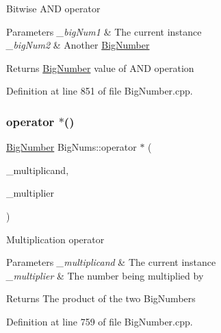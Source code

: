 Bitwise A\+ND operator 
\begin{DoxyParams}{Parameters}
{\em \+\_\+big\+Num1} & The current instance \\
\hline
{\em \+\_\+big\+Num2} & Another \mbox{\hyperlink{class_big_nums_1_1_big_number}{Big\+Number}} \\
\hline
\end{DoxyParams}
\begin{DoxyReturn}{Returns}
\mbox{\hyperlink{class_big_nums_1_1_big_number}{Big\+Number}} value of A\+ND operation 
\end{DoxyReturn}


Definition at line 851 of file Big\+Number.\+cpp.

\mbox{\label{namespace_big_nums_a04ca82b2b679febecf3ac11a4fd58db1}} 
\subsubsection{\texorpdfstring{operator $\ast$()}{operator *()}}
{\footnotesize\ttfamily \mbox{\hyperlink{class_big_nums_1_1_big_number}{Big\+Number}} Big\+Nums\+::operator $\ast$ (\begin{DoxyParamCaption}\item[{\mbox{\hyperlink{class_big_nums_1_1_big_number}{Big\+Number}}}]{\+\_\+multiplicand,  }\item[{const \mbox{\hyperlink{class_big_nums_1_1_big_number}{Big\+Number}} \&}]{\+\_\+multiplier }\end{DoxyParamCaption})}

Multiplication operator 
\begin{DoxyParams}{Parameters}
{\em \+\_\+multiplicand} & The current instance \\
\hline
{\em \+\_\+multiplier} & The number being multiplied by \\
\hline
\end{DoxyParams}
\begin{DoxyReturn}{Returns}
The product of the two Big\+Numbers 
\end{DoxyReturn}


Definition at line 759 of file Big\+Number.\+cpp.

\mbox{\label{namespace_big_nums_a45951a2fb9f239876c94c8917b4d7ad1}} 
